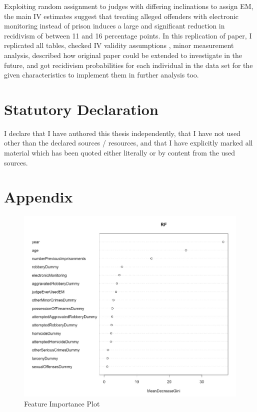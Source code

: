 \documentclass[a4paper,12pt]{article}
\begin{document}
Exploiting random assignment to judges with differing inclinations to assign EM, the main IV estimates suggest that treating alleged offenders with electronic monitoring instead of prison induces a large and significant reduction in recidivism of between 11 and 16 percentage points. In this replication of paper, I replicated all tables, checked IV validity assumptions , minor measurement analysis, described how original paper could be extended to investigate in the future, and got recidivism probabilities for each individual in the data set for the given characteristics to implement them in further analysis too.  


\section{Statutory Declaration}
I declare that I have authored this thesis independently, that I have not used other than the declared sources / resources, and that I have explicitly marked all material which has been quoted either literally or by content from the used sources.


\newpage
\section{Appendix}

\begin{figure}[h]
\centering
\includegraphics[scale=0.50]{feature_imp.jpg}
\caption{Feature Importance Plot}
\label{fig:Figure 1}
\end{figure}
\end{document}
